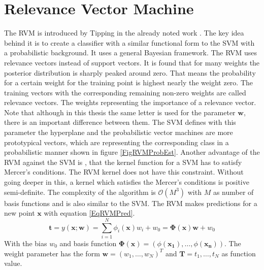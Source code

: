 \section{Relevance Vector Machine}\label{PcSecRVM}
The \ac{RVM} is introduced by Tipping in the already noted work \cite{Tipping.2001}.
The key idea behind it is to create a classifier with a similar functional form to the \ac{SVM} with a probabilistic background. 
It uses a general Bayesian framework.\newline
The \acs{RVM} uses relevance vectors instead of support vectors.
It is found that for many weights the posterior distribution is sharply peaked around zero.
That means the probability for a certain weight for the training point is highest nearly the weight zero.
The training vectors with the corresponding remaining non-zero weights are called relevance vectors.
The weights representing the importance of a relevance vector.\cite[p. 213]{Tipping.2001}
Note that although in this thesis the same letter is used for the parameter $\mathbf{w}$, there is an important difference between them.
The \acs{SVM} defines with this parameter the hyperplane and the probabilistic vector machines are more prototypical vectors, which are representing the corresponding class in a probabilistic manner shown in figure \ref{FigRVMProbEst}.\cite[p. 222]{Tipping.2001}\newline
Another advantage of the \acs{RVM} against the \acs{SVM} is , that the kernel function for a \acs{SVM} has to satisfy Mercer's conditions.
The \ac{RVM} kernel does not have this constraint.\cite[p. 213]{Tipping.2001}\newline
Without going deeper in this, a kernel which satisfies the Mercer's conditions is positive semi-definite.\cite{Graepel.2002}
The complexity of the algorithm is $\mathcal{O}(M^3)$ with $M$ as number of basis functions and is also similar to the \ac{SVM}.\cite[p. 236-237]{Tipping.2001}\newline
The \ac{RVM} makes predictions for a new point $\mathbf{x}$ with equation \ref{EqRVMPred}.\cite[p. 211]{Tipping.2001}
\begin{equation}\label{EqRVMPred}
\mathbf{t} = y(\mathbf{x};\mathbf{w}) = \sum_{i=1}^{N}\phi_i(\mathbf{x})w_i + w_0 = \boldsymbol{\Phi}(\mathbf{x})\mathbf{w} + w_0
\end{equation}
With the bias $w_0$ and basis function $\boldsymbol{\Phi}(\mathbf{x}) = (\phi(\mathbf{x_1}),\dots,\phi(\mathbf{x_n}))$.
The weight parameter has the form $\mathbf{w} = (w_1,\dots,w_N)^T$ and $\mathbf{T}={t_1,\dots,t_N}$ as function value.\\
